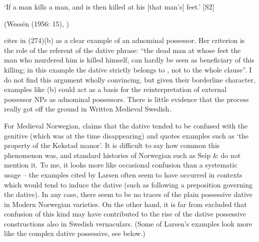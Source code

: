\glt ‘If a man kills a man, and is then killed at his [that man’s] feet.’ [S2]

\z

(Wessén (1956: 15), \citet[211]{Norde1997})


\citet[212]{Norde1997} cites in (274)(b) as a clear example of an adnominal possessor. Her criterion is the role of the referent of the dative phrase: “the dead man at whose feet the man who murdered him is killed himself, can hardly be seen as beneficiary of this killing; in this example the dative  strictly belongs to , not to the whole clause”. I do not find this argument wholly convincing, but given their borderline character, examples like (b) could act as a basis for the reinterpretation of external possessor NPs as adnominal possessors. There is little evidence that the process really got off the ground in Written Medieval Swedish.


For Medieval Norwegian, \citet{Larsen1895} claims that the dative tended to be confused with the genitive (which was at the time disappearing) and quotes examples such as  ‘the property of the Kekstad manor’. It is difficult to say how common this phenomenon was, and standard histories of Norwegian such as Seip \& \citet{Saltveit1971} do not mention it. To me, it looks more like occasional confusion than a systematic usage – the examples cited by Larsen often seem to have occurred in contexts which would tend to induce the dative (such as following a preposition governing the dative). In any case, there seem to be no traces of the plain possessive dative in Modern Norwegian varieties. On the other hand, it is far from excluded that confusion of this kind may have contributed to the rise of the dative possessive constructions also in Swedish vernaculars. (Some of Larsen’s examples look more like the complex dative possessive, see below.)




